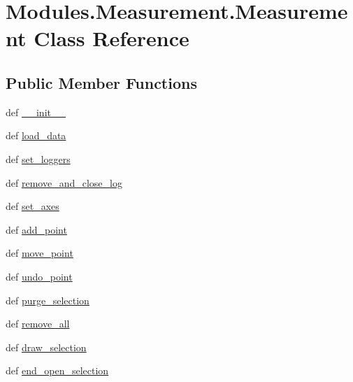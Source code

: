 \hypertarget{classModules_1_1Measurement_1_1Measurement}{\section{Modules.\-Measurement.\-Measurement Class Reference}
\label{classModules_1_1Measurement_1_1Measurement}
}
\subsection*{Public Member Functions}
\begin{DoxyCompactItemize}
\item 
def \hyperlink{classModules_1_1Measurement_1_1Measurement_a7637174a45d0a2cc9541403ce81d7b72}{\-\_\-\-\_\-init\-\_\-\-\_\-}
\item 
def \hyperlink{classModules_1_1Measurement_1_1Measurement_adc4f6243d0f0469c687bfc37d56c457d}{load\-\_\-data}
\item 
def \hyperlink{classModules_1_1Measurement_1_1Measurement_ad98c919c541f6bcaaabc00edf82402c1}{set\-\_\-loggers}
\item 
def \hyperlink{classModules_1_1Measurement_1_1Measurement_ae746d1d78e096518863bb21d5010084a}{remove\-\_\-and\-\_\-close\-\_\-log}
\item 
def \hyperlink{classModules_1_1Measurement_1_1Measurement_adf4d65fd8f6736d0adda63eab1b30aed}{set\-\_\-axes}
\item 
def \hyperlink{classModules_1_1Measurement_1_1Measurement_a880b34f4f9432131df583206205e1090}{add\-\_\-point}
\item 
def \hyperlink{classModules_1_1Measurement_1_1Measurement_a253eae82193e371ca9dd6554e3d45c39}{move\-\_\-point}
\item 
def \hyperlink{classModules_1_1Measurement_1_1Measurement_a9493fe905f46a355557ca77c937a0899}{undo\-\_\-point}
\item 
def \hyperlink{classModules_1_1Measurement_1_1Measurement_aa25b217e412980728d90cb2172570183}{purge\-\_\-selection}
\item 
def \hyperlink{classModules_1_1Measurement_1_1Measurement_a608294e97fc5f4f4041b27b99752bca6}{remove\-\_\-all}
\item 
def \hyperlink{classModules_1_1Measurement_1_1Measurement_a502d2c28d93a136184e9c5cd61275a21}{draw\-\_\-selection}
\item 
def \hyperlink{classModules_1_1Measurement_1_1Measurement_aa1fe159f67062d907cc14cf712cc830c}{end\-\_\-open\-\_\-selection}

\end{DoxyCompactItemize}
